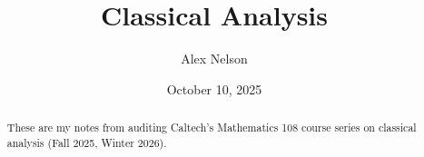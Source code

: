 \documentclass{article}
\title{Classical Analysis}
\author{Alex Nelson}
\date{October 10, 2025}
\begin{document}
\maketitle
\begin{abstract}
These are my notes from auditing Caltech's Mathematics 108 course
series on classical analysis (Fall 2025, Winter 2026).
\end{abstract}

%


\end{document}
